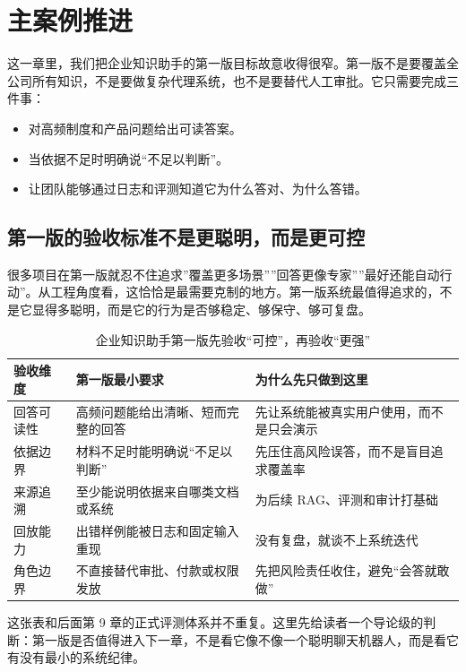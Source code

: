 \section{主案例推进}
这一章里，我们把企业知识助手的第一版目标故意收得很窄。第一版不是要覆盖全公司所有知识，不是要做复杂代理系统，也不是要替代人工审批。它只需要完成三件事：
\begin{itemize}
  \item 对高频制度和产品问题给出可读答案。
  \item 当依据不足时明确说“不足以判断”。
  \item 让团队能够通过日志和评测知道它为什么答对、为什么答错。
\end{itemize}

\subsection{第一版的验收标准不是更聪明，而是更可控}
很多项目在第一版就忍不住追求”覆盖更多场景””回答更像专家””最好还能自动行动”。从工程角度看，这恰恰是最需要克制的地方。第一版系统最值得追求的，不是它显得多聪明，而是它的行为是否够稳定、够保守、够可复盘。

\begin{table}[H]
\centering
\small
\begin{tabularx}{\textwidth}{>{\raggedright\arraybackslash}p{2.8cm}>{\raggedright\arraybackslash}p{3.2cm}>{\raggedright\arraybackslash}X}
\toprule
\textbf{验收维度} & \textbf{第一版最小要求} & \textbf{为什么先只做到这里} \\
\midrule
回答可读性 & 高频问题能给出清晰、短而完整的回答 & 先让系统能被真实用户使用，而不是只会演示 \\
依据边界 & 材料不足时能明确说“不足以判断” & 先压住高风险误答，而不是盲目追求覆盖率 \\
来源追溯 & 至少能说明依据来自哪类文档或系统 & 为后续 RAG、评测和审计打基础 \\
回放能力 & 出错样例能被日志和固定输入重现 & 没有复盘，就谈不上系统迭代 \\
角色边界 & 不直接替代审批、付款或权限发放 & 先把风险责任收住，避免“会答就敢做” \\
\bottomrule
\end{tabularx}
\caption{企业知识助手第一版先验收“可控”，再验收“更强”}
\label{tab:v1-acceptance}
\end{table}

这张表和后面第 9 章的正式评测体系并不重复。这里先给读者一个导论级的判断：第一版是否值得进入下一章，不是看它像不像一个聪明聊天机器人，而是看它有没有最小的系统纪律。


